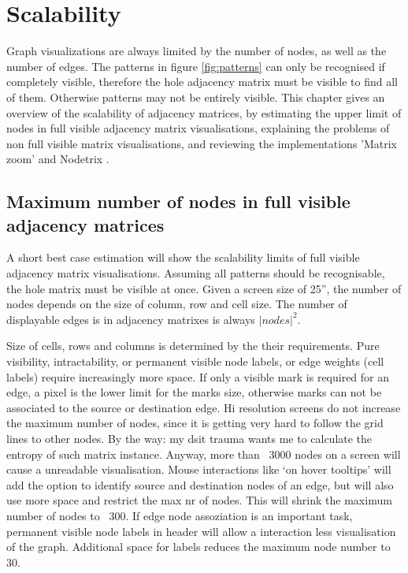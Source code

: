 \chapter{Scalability}
\label{chap:Scalability}

Graph visualizations are always limited by the number of nodes, as well as the number of edges. The patterns in figure \ref{fig:patterns} can only be recognised if completely visible, therefore the hole adjacency matrix must be visible to find all of them. Otherwise patterns may not be entirely visible. This chapter gives an overview of the scalability of adjacency matrices, by estimating the upper limit of nodes in full visible adjacency matrix visualisations, explaining the problems of non full visible matrix visualisations, and reviewing the implementations 'Matrix zoom' \citep{ham-ivis-2003,abello2004} and Nodetrix \citep{henry-nodetrix-2007}.


\section{Maximum number of nodes in full visible adjacency matrices}
A short best case estimation will show the scalability limits of full visible adjacency matrix visualisations. Assuming all patterns should be recognisable, the hole matrix must be visible at once. Given a screen size of 25”, the number of nodes depends on the size of column, row and cell size. The number of displayable edges is in adjacency matrixes is always $|nodes|^2$.

Size of cells, rows and columns is determined by the their requirements. Pure visibility, intractability, or permanent visible node labels, or edge weights (cell labels) require increasingly more space.
If only a visible mark is required for an edge, a pixel is the lower limit for the marks size, otherwise marks can not be associated to the source or destination edge. Hi resolution screens do not increase the maximum number of nodes, since it is getting very hard to follow the grid lines to other nodes. By the way: my dsit trauma wants me to calculate the entropy of such matrix instance. Anyway, more than ~3000 nodes on a screen will cause a unreadable visualisation.
Mouse interactions like ‘on hover tooltips’ will add the option to identify source and destination nodes of an edge, but will also use more space and restrict the max nr of nodes. This will shrink the maximum number of nodes to ~300.
If edge node assoziation is an important task, permanent visible node labels in header will allow a interaction less visualisation of the graph. Additional space for labels reduces the maximum node number to 30.
 
